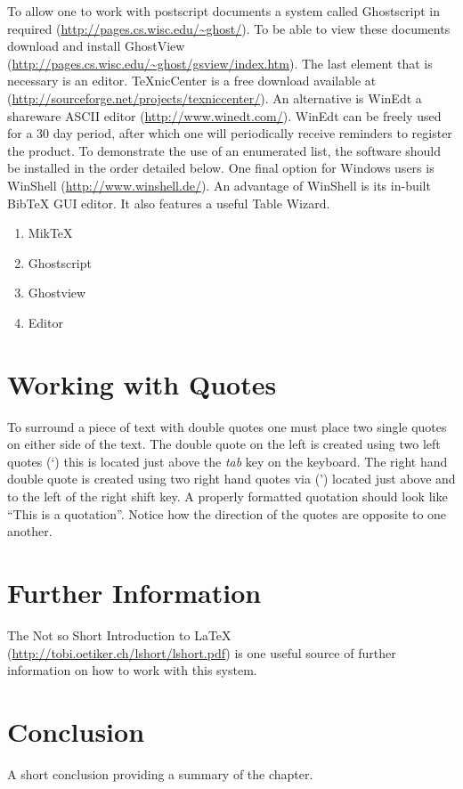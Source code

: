 To allow one to work with postscript documents a system called Ghostscript in required (\url{http://pages.cs.wisc.edu/~ghost/}). To be able to view these documents download and install GhostView (\url{http://pages.cs.wisc.edu/~ghost/gsview/index.htm}). The last element that is necessary is an editor. TeXnicCenter is a free download available at (\url{http://sourceforge.net/projects/texniccenter/}). An alternative is WinEdt a shareware ASCII editor (\url{http://www.winedt.com/}). WinEdt can be freely used for a 30 day period, after which one will periodically receive reminders to register the product. To demonstrate the use of an enumerated list, the software should be installed in the order detailed below. One final option for Windows users is WinShell (\url{http://www.winshell.de/}). An advantage of WinShell is its in-built BibTeX GUI editor. It also features a useful Table Wizard.

\begin{enumerate}
  \item MikTeX
  \item Ghostscript
  \item Ghostview
  \item Editor
\end{enumerate}

\section{Working with Quotes}
To surround a piece of text with double quotes one must place two single quotes on either side of the text. The double quote on the left is created using two left quotes (\lq) this is located just above the \emph{tab} key on the keyboard. The right hand double quote is created using two right hand quotes via (\rq) located just above and to the left of the right shift key. A properly formatted quotation should look like ``This is a quotation''. Notice how the direction of the quotes are opposite to one another.

\section{Further Information}
The Not so Short Introduction to LaTeX (\url{http://tobi.oetiker.ch/lshort/lshort.pdf}) is one useful source of further information on how to work with this system.

\section{Conclusion}
A short conclusion providing a summary of the chapter.
